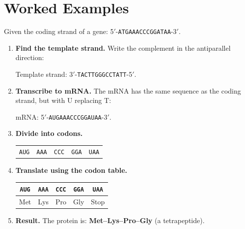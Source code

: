 \section{Worked Examples}
\label{sec:ch1-worked-examples}

\begin{example}
Given the coding strand of a gene: 5$'$-\texttt{ATGAAACCCGGATAA}-3$'$.

\begin{enumerate}[label=\textbf{Step \arabic*:}, leftmargin=3em]
  \item \textbf{Find the template strand.} Write the complement in the antiparallel direction:

  Template strand: 3$'$-\texttt{TACTTGGGCCTAT\/T}-5$'$.

  \item \textbf{Transcribe to mRNA.} The mRNA has the same sequence as the coding strand, but with U replacing T:

  mRNA: 5$'$-\texttt{AUGAAACCCGGAUAA}-3$'$.

  \item \textbf{Divide into codons.}
  \begin{center}
  \begin{tabular}{ccccc}
  \texttt{AUG} & \texttt{AAA} & \texttt{CCC} & \texttt{GGA} & \texttt{UAA} \\
  \end{tabular}
  \end{center}

  \item \textbf{Translate using the codon table.}
  \begin{center}
  \begin{tabular}{ccccc}
  \texttt{AUG} & \texttt{AAA} & \texttt{CCC} & \texttt{GGA} & \texttt{UAA} \\
  \midrule
  Met & Lys & Pro & Gly & \textcolor{dogmared}{Stop} \\
  \end{tabular}
  \end{center}

  \item \textbf{Result.} The protein is: \textbf{Met--Lys--Pro--Gly} (a tetrapeptide).
\end{enumerate}
\end{example}

